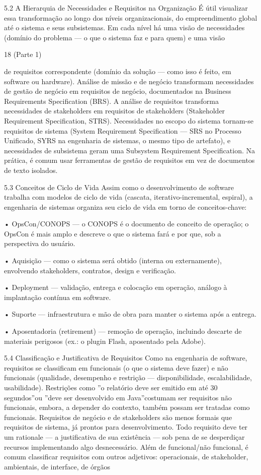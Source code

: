 5.2 A Hierarquia de Necessidades e Requisitos na Organização É útil visualizar essa transformação ao longo dos níveis organizacionais, do empreendimento global até o sistema e seus subsistemas. Em cada nível há uma visão de necessidades (domínio do problema — o que o sistema faz e para quem) e uma visão

18 (Parte 1)

de requisitos correspondente (domínio da solução — como isso é feito, em software ou hardware). Análise de missão e de negócio transformam necessidades de gestão de negócio em requisitos de negócio, documentados na Business Requirements Specification (BRS). A análise de requisitos transforma necessidades de stakeholders em requisitos de stakeholders (Stakeholder Requirement Specification, STRS). Necessidades no escopo do sistema tornam-se requisitos de sistema (System Requirement Specification — SRS no Processo Unificado, SYRS na engenharia de sistemas, o mesmo tipo de artefato), e necessidades de subsistema geram uma Subsystem Requirement Specification. Na prática, é comum usar ferramentas de gestão de requisitos em vez de documentos de texto isolados.

5.3 Conceitos de Ciclo de Vida Assim como o desenvolvimento de software trabalha com modelos de ciclo de vida (cascata, iterativo-incremental, espiral), a engenharia de sistemas organiza seu ciclo de vida em torno de conceitos-chave:

• OpsCon/CONOPS — o CONOPS é o documento de conceito de operação; o OpsCon é mais amplo e descreve o que o sistema fará e por que, sob a perspectiva do usuário.

• Aquisição — como o sistema será obtido (interna ou externamente), envolvendo stakeholders, contratos, design e verificação.

• Deployment — validação, entrega e colocação em operação, análogo à implantação contínua em software.

• Suporte — infraestrutura e mão de obra para manter o sistema após a entrega.

• Aposentadoria (retirement) — remoção de operação, incluindo descarte de materiais perigosos (ex.: o plugin Flash, aposentado pela Adobe).

5.4 Classificação e Justificativa de Requisitos Como na engenharia de software, requisitos se classificam em funcionais (o que o sistema deve fazer) e não funcionais (qualidade, desempenho e restrição — disponibilidade, escalabilidade, usabilidade). Restrições como ”o relatório deve ser emitido em até 30 segundos”ou ”deve ser desenvolvido em Java”costumam ser requisitos não funcionais, embora, a depender do contexto, também possam ser tratadas como funcionais. Requisitos de negócio e de stakeholders são menos formais que requisitos de sistema, já prontos para desenvolvimento. Todo requisito deve ter um rationale — a justificativa de sua existência — sob pena de se desperdiçar recursos implementando algo desnecessário. Além de funcional/não funcional, é comum classificar requisitos com outros adjetivos: operacionais, de stakeholder, ambientais, de interface, de órgãos

